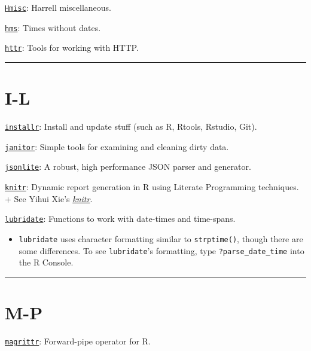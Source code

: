 \documentclass[
]{book}
\providecommand{\tightlist}{%
  \setlength{\itemsep}{0pt}\setlength{\parskip}{0pt}}
\begin{document}
\href{https://CRAN.R-project.org/package=Hmisc}{\texttt{Hmisc}}: Harrell miscellaneous.

\href{https://CRAN.R-project.org/package=hms}{\texttt{hms}}: Times without dates.

\href{https://CRAN.R-project.org/package=httr}{\texttt{httr}}: Tools for working with HTTP.

\begin{center}\rule{0.5\linewidth}{0.5pt}\end{center}

\hypertarget{i-l}{%
\section{I-L}\label{i-l}}

\href{https://CRAN.R-project.org/package=installr}{\texttt{installr}}: Install and update stuff (such as R, Rtools, Rstudio, Git).

\href{https://CRAN.R-project.org/package=janitor}{\texttt{janitor}}: Simple tools for examining and cleaning dirty data.

\href{https://CRAN.R-project.org/package=jsonlite}{\texttt{jsonlite}}: A robust, high performance JSON parser and generator.

\href{https://CRAN.R-project.org/package=knitr}{\texttt{knitr}}: Dynamic report generation in R using Literate Programming techniques.
+ See Yihui Xie's \href{http://yihui.name/knitr/}{\emph{knitr}}.

\href{https://CRAN.R-project.org/package=lubridate}{\texttt{lubridate}}: Functions to work with date-times and time-spans.

\begin{itemize}
\tightlist
\item
  \texttt{lubridate} uses character formatting similar to \texttt{strptime()}, though there are some differences. To see \texttt{lubridate}'s formatting, type \texttt{?parse\_date\_time} into the R Console.
\end{itemize}

\begin{center}\rule{0.5\linewidth}{0.5pt}\end{center}

\hypertarget{m-p}{%
\section{M-P}\label{m-p}}

\href{https://CRAN.R-project.org/package=magrittr}{\texttt{magrittr}}: Forward-pipe operator for R.
\end{document}
